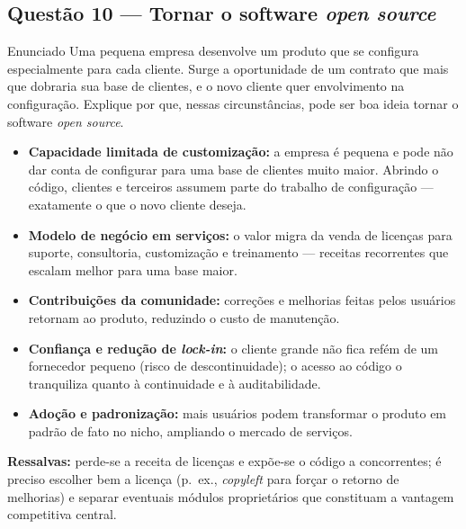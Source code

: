 \documentclass[11pt,a4paper]{article}
\begin{document}
\subsection*{Questão 10 — Tornar o software \emph{open source}}
\begin{questao}{Enunciado}
Uma pequena empresa desenvolve um produto que se configura especialmente para
cada cliente. Surge a oportunidade de um contrato que mais que dobraria sua base
de clientes, e o novo cliente quer envolvimento na configuração. Explique por
que, nessas circunstâncias, pode ser boa ideia tornar o software \emph{open
source}.
\end{questao}
\begin{resposta}
\begin{itemize}[nosep]
  \item \textbf{Capacidade limitada de customização:} a empresa é pequena e pode
        não dar conta de configurar para uma base de clientes muito maior.
        Abrindo o código, clientes e terceiros assumem parte do trabalho de
        configuração — exatamente o que o novo cliente deseja.
  \item \textbf{Modelo de negócio em serviços:} o valor migra da venda de
        licenças para suporte, consultoria, customização e treinamento — receitas
        recorrentes que escalam melhor para uma base maior.
  \item \textbf{Contribuições da comunidade:} correções e melhorias feitas pelos
        usuários retornam ao produto, reduzindo o custo de manutenção.
  \item \textbf{Confiança e redução de \emph{lock-in}:} o cliente grande não fica
        refém de um fornecedor pequeno (risco de descontinuidade); o acesso ao
        código o tranquiliza quanto à continuidade e à auditabilidade.
  \item \textbf{Adoção e padronização:} mais usuários podem transformar o produto
        em padrão de fato no nicho, ampliando o mercado de serviços.
\end{itemize}
\textbf{Ressalvas:} perde-se a receita de licenças e expõe-se o código a
concorrentes; é preciso escolher bem a licença (p.\ ex., \emph{copyleft} para
forçar o retorno de melhorias) e separar eventuais módulos proprietários que
constituam a vantagem competitiva central.
\end{resposta}

\end{document}
